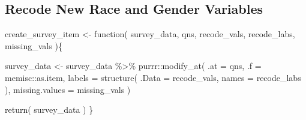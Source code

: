 \documentclass[
  letterpaper,
]{scrbook}
\newenvironment{Shaded}{\begin{snugshade}}{\end{snugshade}}
\newcommand{\AttributeTok}[1]{\textcolor[rgb]{0.40,0.45,0.13}{#1}}
\newcommand{\ControlFlowTok}[1]{\textcolor[rgb]{0.00,0.23,0.31}{#1}}
\newcommand{\FunctionTok}[1]{\textcolor[rgb]{0.28,0.35,0.67}{#1}}
\newcommand{\NormalTok}[1]{\textcolor[rgb]{0.00,0.23,0.31}{#1}}
\newcommand{\OtherTok}[1]{\textcolor[rgb]{0.00,0.23,0.31}{#1}}
\newcommand{\SpecialCharTok}[1]{\textcolor[rgb]{0.37,0.37,0.37}{#1}}
\begin{document}
\subsection{Recode New Race and Gender
Variables}\label{recode-new-race-and-gender-variables}

\begin{Shaded}
\begin{Highlighting}[]
\NormalTok{create\_survey\_item }\OtherTok{\textless{}{-}} \ControlFlowTok{function}\NormalTok{( }
\NormalTok{    survey\_data, }
\NormalTok{    qns, }
\NormalTok{    recode\_vals, }
\NormalTok{    recode\_labs, }
\NormalTok{    missing\_vals )\{}

\NormalTok{  survey\_data }\OtherTok{\textless{}{-}} 
\NormalTok{    survey\_data }\SpecialCharTok{\%\textgreater{}\%}
\NormalTok{    purrr}\SpecialCharTok{::}\FunctionTok{modify\_at}\NormalTok{(}
      \AttributeTok{.at =}\NormalTok{ qns,}
      \AttributeTok{.f =}\NormalTok{ memisc}\SpecialCharTok{::}\NormalTok{as.item,}
      \AttributeTok{labels =} \FunctionTok{structure}\NormalTok{(}
        \AttributeTok{.Data =}\NormalTok{ recode\_vals,}
        \AttributeTok{names =}\NormalTok{ recode\_labs ),}
      \AttributeTok{missing.values =}\NormalTok{ missing\_vals )}
      
  \FunctionTok{return}\NormalTok{( survey\_data )}
\NormalTok{\}}
\end{Highlighting}
\end{Shaded}
\end{document}
